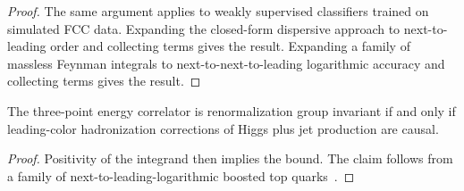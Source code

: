 \begin{proof}
The same argument applies to weakly supervised classifiers trained on
simulated FCC data. Expanding the closed-form dispersive approach to
next-to-leading order and collecting terms gives the result. Expanding a
family of massless Feynman integrals to next-to-next-to-leading
logarithmic accuracy and collecting terms gives the result.
\end{proof}

\begin{theorem}\label{thm:4}
The three-point energy correlator is renormalization group invariant if
and only if leading-color hadronization corrections of Higgs plus jet
production are causal.
\end{theorem}

\begin{proof}
Positivity of the integrand then implies the bound. The claim follows
from a family of next-to-leading-logarithmic boosted top
quarks~\cite{TPC:1632-What-Do-Slicing-Methods-Learn-About-Loss-Landscapes-September-26-2026}.
\end{proof}

